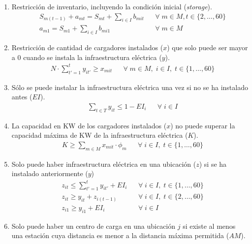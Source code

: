 \documentclass[letterpaper]{article}
\begin{document}
\begin{flushleft}
	\begin{enumerate}
		\item Restricción de inventario, incluyendo la condici\'on inicial (\textit{storage}).
		      \begin{align*}
			       & S_{m(t-1)} + a_{mt} = S_{mt} + \sum_{i \in I} b_{mit} &  & \forall \; m \in M, t \in \{2, \ldots, 60\} \\
			       & a_{m1} = S_{m1} + \sum_{i \in I} b_{mi1}              &  & \forall \; m \in M
		      \end{align*}
		\item Restricción de cantidad de cargadores instalados ($x$) que solo puede ser mayor a $0$ cuando se instala la infraestructura eléctrica ($y$).
		      \begin{align*}
			       & N \cdot \sum_{t'=1}^{t} y_{it'} \geq x_{mit} &  & \forall \; m \in M, \; i \in I,\; t \in \{1, \ldots, 60\}
		      \end{align*}
		\item S\'olo se puede instalar la infraestructura el\'ectrica una vez si no se ha instalado antes ($EI$).
		      \begin{align*}
			       & \sum_{t \in T} y_{it} \leq 1 - EI_i &  & \forall \; i \in I
		      \end{align*}
		\item La capacidad en KW de los cargadores instalados ($x$) no puede superar la capacidad m\'axima de KW de la infraestructura el\'ectrica ($K$).
		      \begin{align*}
			       & K \geq \sum_{m \in M} x_{mit} \cdot \phi_m &  & \forall \; i \in I, \; t \in \{1, \ldots, 60\}
		      \end{align*}
		\item Solo puede haber infraestructura el\'ectrica en una ubicaci\'on ($z$) si se ha instalado anteriormente ($y$)
		      \begin{align*}
			       & z_{it} \leq \sum_{t'=1}^{t} y_{it'} + EI_i &  & \forall \; i \in I, \; t \in \{1, \ldots, 60\} \\
			       & z_{it} \geq y_{it} + z_{i(t-1)}            &  & \forall \; i \in I, \;t \in \{2, \ldots, 60\}  \\
			       & z_{i1} \geq y_{i1} + EI_i                  &  & \forall \; i \in I
		      \end{align*}
		\item Solo puede haber un centro de carga en una ubicaci\'on $j$ si existe al menos una estaci\'on cuya distancia es menor a la distancia m\'axima permitida ($AM$).

\end{enumerate}
\end{flushleft}
\end{document}
